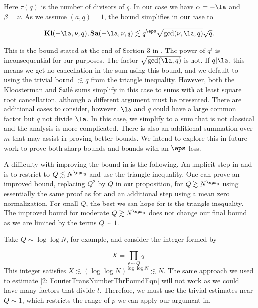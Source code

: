 \documentclass[11pt]{amsart}
\begin{document}
Here $\tau(q)$ is the number of divisors of $q$. In our case we have $\alpha = -\la$ and $\beta = \nu$. As we assume $(a,q)=1$, the bound simplifies in our case to

\begin{equation*}
    \textbf{Kl}(-\la,\nu,q),\textbf{Sa}(-\la,\nu,q) \lesssim q^\eps\sqrt{\gcd(\nu,\la,q)}\sqrt{q}.
\end{equation*}

This is the bound stated at the end of Section 3 in \cite{bourgainDemeterDiscreteRestrictImprovements2013}. The power of $q^\epsilon$ is inconsequential for our purposes. The factor $\sqrt{\gcd(\la,q)}$ is not. If $q|\la$, this means we get no cancellation in the sum using this bound, and we default to using the trivial bound $\lesssim q$ from the triangle inequality. However, both the Kloosterman and Sail\'e sums simplify in this case to sums with at least square root cancellation, although a different argument must be presented. There are additional cases to consider, however. $\la$ and $q$ could have a large common factor but $q$ not divide $\la$. In this case, we simplify to a sum that is not classical and the analysis is more complicated. There is also an additional summation over $m$ that may assist in proving better bounds. We intend to explore this in future work to prove both sharp bounds and bounds with an $\eps$-loss. 

A difficulty with improving the bound in  is the following. An implicit step in \cite{bourgainTorusEFunc1993} and \cite{bourgainDemeterDiscreteRestrictImprovements2013} is to restrict to $Q\lesssim N^{\eps_0}$ and use the triangle inequality.  One can prove an improved bound, replacing $Q^2$ by $Q$ in our proposition, for $Q\gtrsim N^{\eps_0}$ using essentially the same proof as for  and an additional step using a mean zero normalization. For small $Q$, the best we can hope for is the triangle inequality. The improved bound for moderate $Q\gtrsim N^{\eps_0}$ does not change our final bound as we are limited by the terms $Q\sim 1$. 


Take $Q\sim \log \log N$, for example, and consider the integer formed by

\begin{equation*}
    X=\prod_{q\sim Q}q.
\end{equation*}
This integer satisfies $X\lesssim (\log \log N)^{\log \log N}\lesssim N$. The same approach we used to estimate \eqref{2: FourierTransNumberThrBoundEqn} will not work as we could have many factors that divide $l$. Therefore, we must use the trivial estimates near $Q\sim 1$, which restricts the range of $p$ we can apply our argument in. 
\end{document}
